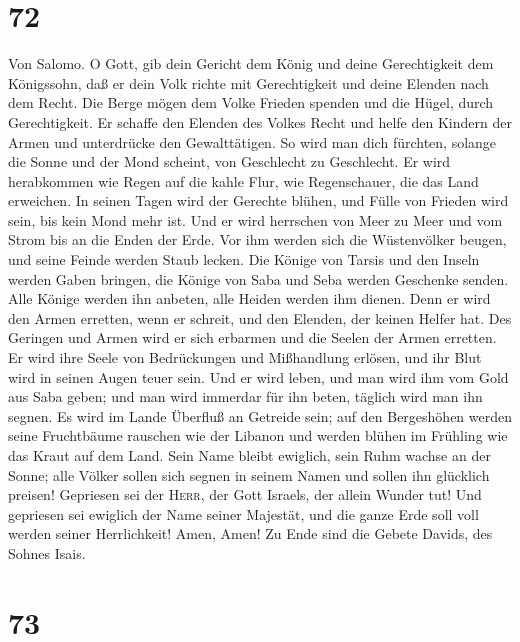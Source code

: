\hypertarget{section-71}{%
\section{72}\label{section-71}}

 Von Salomo. O Gott, gib dein Gericht dem König und deine
Gerechtigkeit dem Königssohn,  daß er dein Volk richte mit
Gerechtigkeit und deine Elenden nach dem Recht.  Die Berge
mögen dem Volke Frieden spenden und die Hügel, durch Gerechtigkeit.
 Er schaffe den Elenden des Volkes Recht und helfe den
Kindern der Armen und unterdrücke den Gewalttätigen.  So
wird man dich fürchten, solange die Sonne und der Mond scheint, von
Geschlecht zu Geschlecht.  Er wird herabkommen wie Regen
auf die kahle Flur, wie Regenschauer, die das Land erweichen.
 In seinen Tagen wird der Gerechte blühen, und Fülle von
Frieden wird sein, bis kein Mond mehr ist.  Und er wird
herrschen von Meer zu Meer und vom Strom bis an die Enden der Erde.
 Vor ihm werden sich die Wüstenvölker beugen, und seine
Feinde werden Staub lecken.  Die Könige von Tarsis und
den Inseln werden Gaben bringen, die Könige von Saba und Seba werden
Geschenke senden.  Alle Könige werden ihn anbeten, alle
Heiden werden ihm dienen.  Denn er wird den Armen
erretten, wenn er schreit, und den Elenden, der keinen Helfer hat.
 Des Geringen und Armen wird er sich erbarmen und die
Seelen der Armen erretten.  Er wird ihre Seele von
Bedrückungen und Mißhandlung erlösen, und ihr Blut wird in seinen Augen
teuer sein.  Und er wird leben, und man wird ihm vom Gold
aus Saba geben; und man wird immerdar für ihn beten, täglich wird man
ihn segnen.  Es wird im Lande Überfluß an Getreide sein;
auf den Bergeshöhen werden seine Fruchtbäume rauschen wie der Libanon
und werden blühen im Frühling wie das Kraut auf dem Land.
 Sein Name bleibt ewiglich, sein Ruhm wachse an der
Sonne; alle Völker sollen sich segnen in seinem Namen und sollen ihn
glücklich preisen!  Gepriesen sei der \textsc{Herr}, der
Gott Israels, der allein Wunder tut!  Und gepriesen sei
ewiglich der Name seiner Majestät, und die ganze Erde soll voll werden
seiner Herrlichkeit! Amen, Amen!  Zu Ende sind die Gebete
Davids, des Sohnes Isais.

\hypertarget{section-72}{%
\section{73}\label{section-72}}

